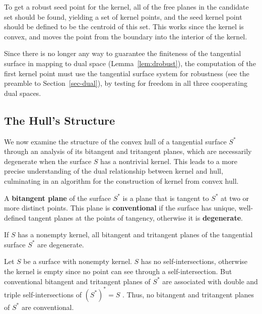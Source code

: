 \documentclass{elsart}
\begin{document}
To get a robust seed point for the kernel,
all of the free planes in the candidate set should be found,
yielding a set of kernel points, and the seed kernel point 
should be defined to be the centroid of this set.
This works since the kernel is convex, and moves the point from the boundary
into the interior of the kernel.

Since there is no longer any way to guarantee the finiteness of the tangential surface
in mapping to dual space (Lemma~\ref{lem:drobust}),
the computation of the first kernel point must use the tangential surface system 
for robustness (see the preamble to Section~\ref{sec-dual}),
by testing for freedom in all three cooperating dual spaces.


\subsection{The Hull's Structure}
\label{sec:cusp}

We now examine the structure of the convex hull of a tangential
surface $S^*$ through an analysis of its bitangent and tritangent planes,
which are necessarily degenerate when the surface $S$ has a nontrivial kernel.
This leads to a more precise understanding of the 
dual relationship between kernel and hull, culminating in an
algorithm for the construction of kernel from convex hull.

\begin{defn2}
A {\bf bitangent plane} of the surface $S^*$ is a plane that
is tangent to $S^*$ at two or more distinct points.
This plane is {\bf conventional} if the surface has unique, well-defined 
tangent planes at the points of tangency,
otherwise it is {\bf degenerate}.
\end{defn2}

\begin{lemma}
If $S$ has a nonempty kernel, all bitangent and tritangent planes 
of the tangential surface $S^*$ are degenerate.
\end{lemma}
\prf
Let $S$ be a surface with nonempty kernel.
$S$ has no self-intersections, otherwise the kernel is empty
since no point can see through a self-intersection.
But conventional bitangent and tritangent planes of $S^*$ are associated
with double and triple self-intersections of $(S^*)^* = S$ \cite{jj02,jj03tangsurf}.
Thus, no bitangent and tritangent planes of $S^*$ are conventional.
\QED
\end{document}
